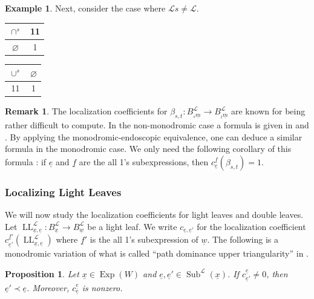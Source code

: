 \documentclass{amsart}
\newcommand{\scrL}{\mathcal{L}}
\DeclareMathOperator{\LL}{LL}
\DeclareMathOperator{\Exp}{Exp}
\DeclareMathOperator{\Subexp}{Sub}
\newcommand{\ue}{\underline{e}}
\newcommand{\uf}{\underline{f}}
\newcommand{\uw}{\underline{w}}
\newcommand{\ux}{\underline{x}}
\renewcommand{\emptyset}{\varnothing}
\newtheorem{proposition}[subsubsection]{Proposition}
\theoremstyle{definition}
\newtheorem{example}[subsubsection]{Example}
\newtheorem{remark}[subsubsection]{Remark}
\numberwithin{equation}{subsection}
\begin{document}
\begin{example}
    Next, consider the case where $\scrL s \neq \scrL$.

    \begin{center}
    \begin{tabular}{c | c }
        $\cap^s$ & 11 \\
        \hline
        $\emptyset$ & 1
    \end{tabular}\qquad\qquad
    \begin{tabular}{c | c }
        $\cup^s$ & $\emptyset$ \\
        \hline
        11 & 1
    \end{tabular}
\end{center}
\end{example}

\begin{remark}\label{rem:loc_coeffs_for_beta}
    The localization coefficients for $\beta_{s,t} : B_{{}_s \underline{m}}^{\scrL} \to B_{{}_t \underline{m}}^{\scrL}$ are known for being rather difficult to compute.
    In the non-monodromic case a formula is given in \cite{Abe21} and \cite{EW17}.
    By applying the monodromic-endoscopic equivalence, one can deduce a similar formula in the monodromic case.
    We only need the following corollary of this formula \cite[(2.31)]{EW17}: if $\ue$ and $\uf$ are the all 1's subexpressions, then $c_{\ue}^{\uf} (\beta_{s,t}) = 1$.
\end{remark}

\subsubsection{Localizing Light Leaves}

We will now study the localization coefficients for light leaves and double leaves.
Let $\LL_{\ux, \ue}^{\scrL} : B_{\ux}^{\scrL} \to B_{\uw}^{\scrL}$ be a light leaf. 
We write $c_{\ue, \ue'}$ for the localization coefficient $c_{\ue'}^{\uf'} (\LL_{\ux, \ue}^{\scrL})$ where $\uf'$ is the all 1's subexpression of $\uw$.
The following is a monodromic variation of what is called ``path dominance upper triangularity'' in \cite{EW}.

\begin{proposition}\label{prop:path_dominance_upper_triangularity}
    Let $\ux \in \Exp (W)$ and $\ue, \ue' \in \Subexp^{\scrL} (\ux)$.
    If $c_{\ue'}^{\ue} \neq 0$, then $\ue' \prec \ue$. Moreover, $c_{\ue}^{\ue}$ is nonzero. 
\end{proposition}
\end{document}
